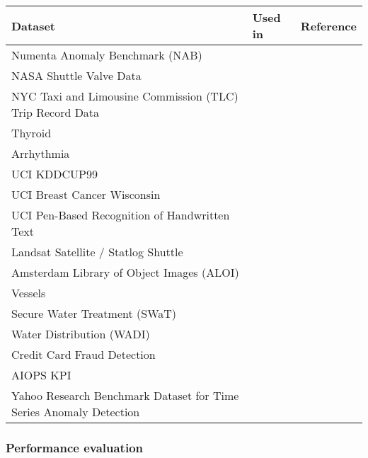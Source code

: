 \documentclass{mproj}
\begin{document}
\begin{center}
\begin{longtable}{ |>{\raggedright}p{4cm}|p{6cm}|p{4cm}| }
	\hline
	\textbf{Dataset} & \textbf{Used in} & \textbf{Reference} \\
	\hline
	Numenta Anomaly Benchmark (NAB) & \cite{ADSaS} & \cite{NAB} \\
	\hline
	NASA Shuttle Valve Data & \cite{deepLearningSurvey, lstmEncoderDecorder, lstmTimeSeriesAnomalyDetection} & \cite{NASAShuttleValve} \\
	\hline
	NYC Taxi and Limousine Commission (TLC) Trip Record Data & \cite{deepLearningSurvey} & \cite{NYCTaxiCount} \\
	\hline
	Thyroid & \cite{DAGMM} & \cite{ODDS} \\
	\hline
	Arrhythmia & \cite{DAGMM} & \cite{ODDS} \\
	\hline
	UCI KDDCUP99 & \cite{DAGMM, comparativeUnsupervisedEvaluation} & \cite{ODDS, UCIRepository} \\
	\hline
	UCI Breast Cancer Wisconsin & \cite{comparativeUnsupervisedEvaluation} & \cite{UCIRepository} \\
	\hline
	UCI Pen-Based Recognition of Handwritten Text & \cite{comparativeUnsupervisedEvaluation} & \cite{UCIRepository} \\
	\hline
	Landsat Satellite / Statlog Shuttle & \cite{comparativeUnsupervisedEvaluation} & \cite{ODDS} \\
	\hline
	Amsterdam Library of Object Images (ALOI) & \cite{comparativeUnsupervisedEvaluation} & \cite{ALOI} \\
	\hline
	Vessels & \cite{deepLearningSurvey} & \cite{NOAA} \\
	\hline
	Secure Water Treatment (SWaT) & \cite{deepLearningSurvey} & \cite{SingaporeSWAT}\\
	\hline
	Water Distribution (WADI) & \cite{deepLearningSurvey} & \cite{SingaporeWADI}\\
	\hline
	Credit Card Fraud Detection & \cite{deepLearningSurvey} & \cite{CreditCardFraudData} \\
	\hline
	AIOPS KPI & \cite{MicrosoftTimeSeries} & \cite{AIOPSKPI} \\
	\hline
	Yahoo Research Benchmark Dataset for Time Series Anomaly Detection & \cite{MicrosoftTimeSeries} & \cite{YahooLabs} \\
	\hline
\end{longtable}
\end{center}

\subsubsection{Performance evaluation}
\label{subsubsection:performance-evaluation}
\end{document}
